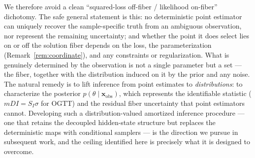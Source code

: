 We therefore avoid a clean ``squared-loss off-fiber / likelihood on-fiber'' dichotomy. The safe general statement is this: no deterministic point estimator can uniquely recover the sample-specific truth from an ambiguous observation, nor represent the remaining uncertainty; and whether the point it does select lies on or off the solution fiber depends on the loss, the parameterization (Remark~\ref{rem:coordinate}), and any constraints or regularization. What is genuinely determined by the observation is not a single parameter but a set --- the fiber, together with the distribution induced on it by the prior and any noise. The natural remedy is to lift inference from point estimates to \emph{distributions}: to characterize the posterior $p(\theta \mid \mathbf{x}_\mathrm{obs})$, which represents the identifiable statistic ($mDI = S_I\sigma$ for OGTT) and the residual fiber uncertainty that point estimators cannot. Developing such a distribution-valued amortized inference procedure --- one that retains the decoupled hidden-state structure but replaces the deterministic maps with conditional samplers --- is the direction we pursue in subsequent work, and the ceiling identified here is precisely what it is designed to overcome.
